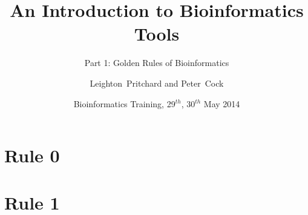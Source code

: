 %




\title[Intro to Bioinformatics] %
{An Introduction to Bioinformatics Tools}
\subtitle{Part 1: Golden Rules of Bioinformatics}
\author[Pritchard, Cock] %
{Leighton~Pritchard and Peter~Cock}
\date[May 2014] %
{Bioinformatics Training, 29$^{th}$, 30$^{th}$ May 2014}
\subject{Bioinformatics}





\frame[plain]{\titlepage}
  
%
   
    
\section{Rule 0}
  

\section{Rule 1}
%
